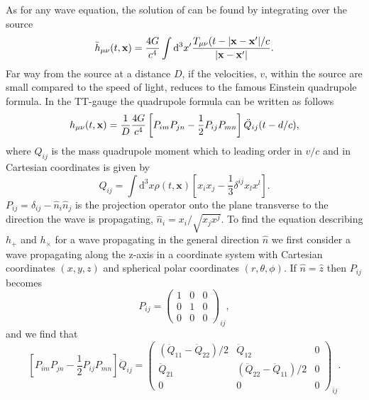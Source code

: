 As for any wave equation, the solution of  can be found by integrating over the source
\begin{equation} \label{eqT:sol}
\bar{h}_{\mu\nu}(t,\mathbf{x}) = \frac{4G}{c^4} \int \mathrm{d}^3 x' \frac{T_{\mu\nu}(t-|\mathbf{x}-\mathbf{x'}|/c}{|\mathbf{x}-\mathbf{x'}|}.
\end{equation}
Far way from the source at a distance $D$, if the velocities, $v$, within the source are small compared to the speed of light,  reduces to the famous Einstein quadrupole formula. In the TT-gauge the quadrupole formula can be written as follows  
\begin{equation} \label{eqT:equad}
h_{\mu\nu}(t,\mathbf{x}) = \frac{1}{D} \frac{4G}{c^4} \left [P_{im} P_{jn} - \frac{1}{2} P_{ij} P_{mn} \right ] \ddot{Q}_{ij} (t -d/c),
\end{equation}
where $Q_{ij}$ is the mass quadrupole moment which to leading order in $v/c$ and in Cartesian coordinates is given by
\begin{equation} \label{eqT:quad}
Q_{ij} = \int \mathrm{d}^3 x \rho(t,\mathbf{x})\left [x_i x_j - \frac{1}{3} \delta^{ij} x_l x^l \right ].
\end{equation}
$P_{ij} = \delta_{ij} -\hat{n}_i \hat{n}_j$ is the projection operator onto the plane transverse to the direction the wave is propagating,
$\hat{n}_i = x_i / \sqrt{x_j x^j}$. To find the equation describing $h_{+}$ and $h_{\times}$ for a wave propagating in the general direction
$\hat{n}$ we first consider a wave propagating along the z-axis in a coordinate system with Cartesian coordinates $(x,y,z)$ and
spherical polar coordinates $(r,\theta,\phi)$. 
If $\hat{n} = \hat{z}$ then $P_{ij}$ becomes
\begin{equation} \label{eqT:pij}
P_{ij}  = 
  \begin{pmatrix}
    1 & 0 & 0  \\
    0 & 1 & 0 \\
    0 & 0 & 0
  \end{pmatrix}_{ij},
\end{equation}
and we find that 
\begin{equation} \label{eqT:pjz}
\left [P_{im} P_{jn} - \frac{1}{2} P_{ij} P_{mn} \right ] \ddot{Q}_{ij} = 
  \begin{pmatrix}
    (\ddot{Q}_{11}-\ddot{Q}_{22})/2 & \ddot{Q}_{12} & 0  \\
    \ddot{Q}_{21} & (\ddot{Q}_{22} - \ddot{Q}_{11})/2 & 0 \\
    0 & 0 & 0
  \end{pmatrix}_{ij}.
\end{equation}
